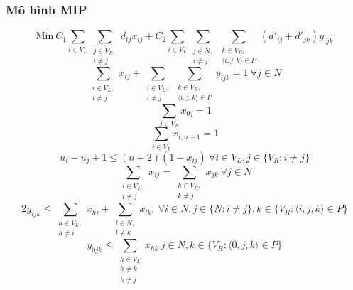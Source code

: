 \documentclass[a4paper,12pt]{report}
\begin{document}
\subsubsection{Mô hình \ac{MIP}} 
\begin{center}

\begin{equation} \label{eqn:1}
\text{Min}\  C_1 \sum_{i\in V_L} \sum_{\substack{j \in V_R,\\ i\neq j}}d_{ij}x_{ij}+C_2\sum_{i\in V_L} \sum_{\substack{j\in N,\\i \neq j }} \sum_{\substack{k \in V_R,\\ \langle i,j,k \rangle \in P}}(d'_{ij}+d'_{jk})y_{ijk}  
\end{equation}
\begin{equation}\label{eqn:2}
 \sum_{\substack{i \in V_L, \\i \neq j}}x_{ij}+\sum_{\substack{i \in V_L,\\i \neq j}}\sum_{\substack{k \in V_R,\\\langle i,j,k \rangle \in P}}y_{ijk}=1 \ \forall j \in N
\end{equation}
\begin{equation}\label{eqn:3}
\sum_{j \in V_R} x_{0j}=1
\end{equation}
\begin{equation}\label{eqn:4}
\sum_{i \in V_L}x_{i,n+1}=1
\end{equation}
\begin{equation}\label{eqn:5}
u_i-u_j+1 \leq (n+2)(1-x_{ij}) \ \forall i \in V_L, j \in \{V_R:i \neq j\}
\end{equation}
\begin{equation}\label{eqn:6}
\sum_{\substack{i \in V_L, \\ i \neq j}} x_{ij}=\sum_{\substack{k \in V_R,\\k \neq j}} x_{jk} \ \forall j \in N
\end{equation}
\begin{equation}\label{eqn:7}
2y_{ijk} \leq \sum_{\substack{h \in V_L, \\ h \neq i}} x_{hi} +\sum_{\substack{ l \in N,\\ l \neq k}} x_{lk}, \ \forall i \in N, j \in \{N:i \neq j\},k \in \{V_R:\langle i,j,k \rangle \in P\}
\end{equation}
\begin{equation}\label{eqn:8}
y_{0jk} \leq \sum_{\substack{h \in V_L \\ h \neq k\\ h \neq j}} x_{hk} \ j\in N,k \in \{V_R:\langle 0,j,k \rangle \in P\}

\end{equation}
\end{center}
\end{document}
